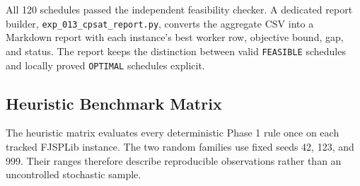 ﻿\documentclass[11pt]{article}
\begin{document}
All 120 schedules passed the independent feasibility checker. A dedicated
report builder, \texttt{exp\_013\_cpsat\_report.py}, converts the aggregate CSV
into a Markdown report with each instance's best worker row, objective bound,
gap, and status. The report keeps the distinction between valid
\texttt{FEASIBLE} schedules and locally proved \texttt{OPTIMAL} schedules
explicit.

\subsection{Heuristic Benchmark Matrix}

The heuristic matrix evaluates every deterministic Phase 1 rule once on each
tracked FJSPLib instance. The two random families use fixed seeds 42, 123, and
999. Their ranges therefore describe reproducible observations rather than an
uncontrolled stochastic sample.
\end{document}
